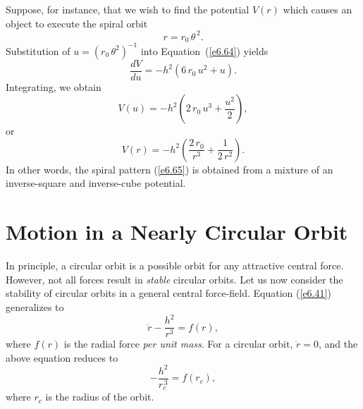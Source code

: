 Suppose, for instance, that we wish to find the potential $V(r)$ which causes
an object to execute the spiral orbit
\begin{equation}\label{e6.65}
r = r_0\,\theta^{\,2}.
\end{equation}
Substitution of $u = (r_0\,\theta^2)^{-1}$ into Equation~(\ref{e6.64}) yields
\begin{equation}
\frac{d V}{du} = - h^2\left(6\,r_0\,u^2 + u\right).
\end{equation}
Integrating, we obtain
\begin{equation}
V(u) = -h^2\left(2\,r_0\,u^3 + \frac{u^2}{2}\right),
\end{equation}
or
\begin{equation}
V(r) = - h^2\left(\frac{2\,r_0}{r^3} + \frac{1}{2\,r^2}\right).
\end{equation}
In other words, the spiral pattern (\ref{e6.65}) is obtained from a mixture
of an inverse-square and inverse-cube potential.

\section{Motion in a Nearly Circular Orbit}
In principle, a circular orbit is a possible orbit for any attractive central force.
However, not all forces result in {\em stable}\/ circular orbits.
Let us now consider the stability of circular orbits in a general central force-field. Equation (\ref{e6.41}) generalizes to
\begin{equation}\label{e6.69}
\ddot{r} - \frac{h^2}{r^3} = f(r),
\end{equation}
where $f(r)$ is the radial force {\em per unit mass}. For a circular orbit,
$\ddot{r}=0$, and the above equation reduces to
\begin{equation}\label{e6.70}
-\frac{h^2}{r_c^{\,3}} = f(r_c),
\end{equation}
where $r_c$ is the radius of the orbit. 

